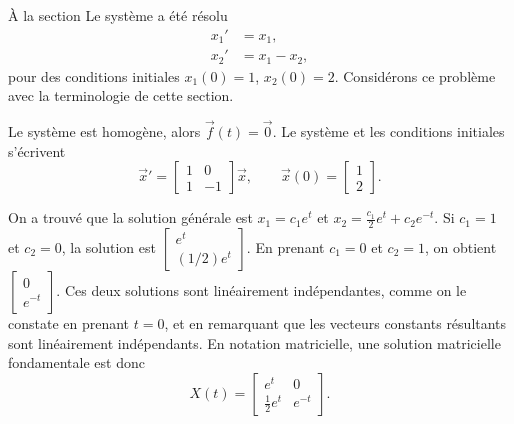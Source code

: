 \begin{example}
À la section  Le système a été résolu
\begin{align*}
x_1' & = x_1 , \\
x_2' & = x_1 - x_2 ,
\end{align*}
pour des conditions initiales $x_1(0) = 1$, $x_2(0) = 2$.
Considérons ce problème avec la terminologie de cette section.

Le système est homogène, alors $\vec{f}(t) = \vec{0}$.
Le système et les conditions initiales s’écrivent
\begin{equation*}
{\vec{x}}'
=
\begin{bmatrix}
1 & 0 \\
1 & -1
\end{bmatrix}
\vec{x} ,
\qquad
\vec{x}(0) = 
\begin{bmatrix}
1 \\
2
\end{bmatrix} .
\end{equation*}

On a trouvé que la solution générale est
$x_1 = c_1 e^t $ et
$x_2 = \frac{c_1}{2}e^{t} + c_2e^{-t}$. 
Si $c_1=1$ et $c_2=0$, la solution est
$\left[ \begin{smallmatrix} e^t \\ (1/2) e^t \end{smallmatrix} \right]$.
En prenant $c_1=0$ et $c_2=1$, on obtient
$\left[ \begin{smallmatrix} 0 \\ e^{-t} \end{smallmatrix} \right]$.
Ces deux solutions sont linéairement indépendantes, comme on le constate en prenant
$t=0$, et en remarquant que les vecteurs constants résultants sont linéairement indépendants. En notation matricielle, une solution matricielle fondamentale est donc
\begin{equation*}
X(t) = 
\begin{bmatrix}
e^t & 0 \\
\frac{1}{2} e^t & e^{-t}
\end{bmatrix} .
\end{equation*}


\end{example}
